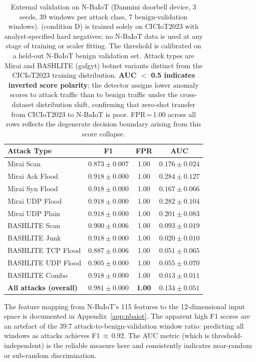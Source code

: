 
\begin{table}[h]
\centering
\caption{
  External validation on N-BaIoT (Danmini doorbell device, 3 seeds,
  39 windows per attack class, 7 benign-validation windows).
  \ours{} (condition D) is trained solely on CICIoT2023 with analyst-specified
  hard negatives; no N-BaIoT data is used at any stage of training or
  scaler fitting.
  The threshold is calibrated on a held-out N-BaIoT benign validation set.
  Attack types are Mirai and BASHLITE (gafgyt) botnet variants distinct
  from the CICIoT2023 training distribution.
  \textbf{AUC $<$ 0.5 indicates inverted score polarity}; the detector
  assigns lower anomaly scores to attack traffic than to benign traffic
  under the cross-dataset distribution shift, confirming that
  zero-shot transfer from CICIoT2023 to N-BaIoT is poor.
  FPR\,=\,1.00 across all rows reflects the degenerate decision boundary
  arising from this score collapse.
}
\label{tab:nbaiot}
\begin{tabular}{lccc}
\toprule
Attack Type & F1 & FPR & AUC \\
\midrule
Mirai Scan         & $0.873 \pm 0.007$ & 1.00 & $0.176 \pm 0.024$ \\
Mirai Ack Flood    & $0.918 \pm 0.000$ & 1.00 & $0.284 \pm 0.127$ \\
Mirai Syn Flood    & $0.918 \pm 0.000$ & 1.00 & $0.167 \pm 0.066$ \\
Mirai UDP Flood    & $0.918 \pm 0.000$ & 1.00 & $0.282 \pm 0.104$ \\
Mirai UDP Plain    & $0.918 \pm 0.000$ & 1.00 & $0.201 \pm 0.083$ \\
BASHLITE Scan      & $0.900 \pm 0.006$ & 1.00 & $0.093 \pm 0.019$ \\
BASHLITE Junk      & $0.918 \pm 0.000$ & 1.00 & $0.020 \pm 0.010$ \\
BASHLITE TCP Flood & $0.887 \pm 0.006$ & 1.00 & $0.051 \pm 0.065$ \\
BASHLITE UDP Flood & $0.905 \pm 0.000$ & 1.00 & $0.055 \pm 0.070$ \\
BASHLITE Combo     & $0.918 \pm 0.000$ & 1.00 & $0.013 \pm 0.011$ \\
\midrule
\textbf{All attacks (overall)} & $\mathbf{0.981 \pm 0.000}$ & \textbf{1.00} & $\mathbf{0.134 \pm 0.051}$ \\
\bottomrule
\end{tabular}
\vspace{2pt}
\begin{flushleft}
\footnotesize
The feature mapping from N-BaIoT's 115 features to the 12-dimensional \ours{}
input space is documented in Appendix~\ref{app:nbaiot}.
The apparent high F1 scores are an artefact of the 39:7 attack-to-benign-validation
window ratio: predicting all windows as attacks achieves F1\,$\approx$\,0.92.
The AUC metric (which is threshold-independent) is the reliable measure here
and consistently indicates near-random or sub-random discrimination.
\end{flushleft}
\end{table}
